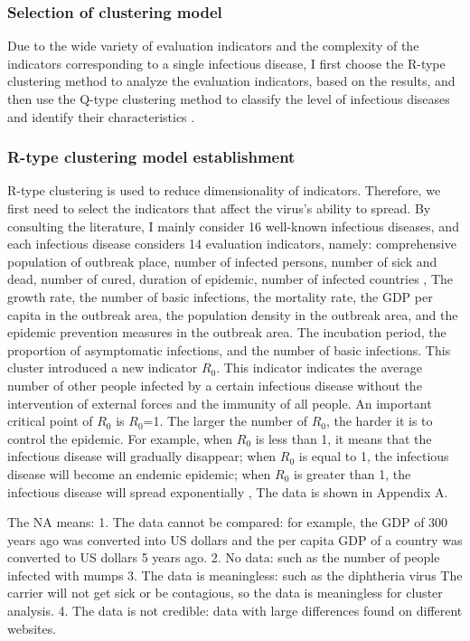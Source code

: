 \documentclass[a4paper, 11pt,twoside=true]{scrartcl}
\begin{document}
\subsubsection{Selection of clustering model}
\qquad Due to the wide variety of evaluation indicators and the complexity of the indicators corresponding to a single infectious disease, I first choose the R-type clustering method to analyze the evaluation indicators, based on the results, and then use the Q-type clustering method to classify the level of infectious diseases and identify their characteristics .

\subsubsection{R-type clustering model establishment}
\qquad R-type clustering is used to reduce dimensionality of indicators. Therefore, we first need to select the indicators that affect the virus's ability to spread. By consulting the literature, I mainly consider 16 well-known infectious diseases, and each infectious disease considers 14 evaluation indicators, namely: comprehensive population of outbreak place, number of infected persons, number of sick and dead, number of cured, duration of epidemic, number of infected countries , The growth rate, the number of basic infections, the mortality rate, the GDP per capita in the outbreak area, the population density in the outbreak area, and the epidemic prevention measures in the outbreak area. The incubation period, the proportion of asymptomatic infections, and the number of basic infections. This cluster introduced a new indicator $R_0$. This indicator indicates the average number of other people infected by a certain infectious disease without the intervention of external forces and the immunity of all people. An important critical point of $R_0$ is $R_0$=1. The larger the number of $R_0$, the harder it is to control the epidemic. For example, when $R_0$ is less than 1, it means that the infectious disease will gradually disappear; when $R_0$ is equal to 1, the infectious disease will become an endemic epidemic; when $R_0$ is greater than 1, the infectious disease will spread exponentially , The data is shown in Appendix A.

\quad The NA means: 1. The data cannot be compared: for example, the GDP of 300 years ago was converted into US dollars and the per capita GDP of a country was converted to US dollars 5 years ago. 2. No data: such as the number of people infected with mumps 3. The data is meaningless: such as the diphtheria virus The carrier will not get sick or be contagious, so the data is meaningless for cluster analysis. 4. The data is not credible: data with large differences found on different websites.
\end{document}
